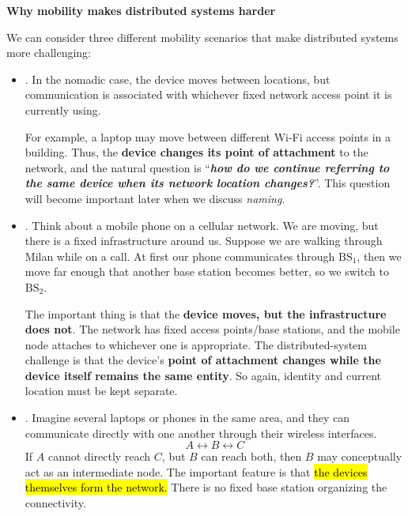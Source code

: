 \highspace
\begin{flushleft}
    \textcolor{Green3}{ \textbf{Why mobility makes distributed systems harder}}
\end{flushleft}
We can consider three different mobility scenarios that make distributed systems more challenging:
\begin{itemize}
    \item {}. In the nomadic case, the device moves between locations, but communication is associated with whichever fixed network access point it is currently using.

        For example, a laptop may move between different Wi-Fi access points in a building. Thus, the \textbf{device changes its point of attachment} to the network, and the natural question is ``\emph{\textbf{how do we continue referring to the same device when its network location changes?}}''. This question will become important later when we discuss \emph{naming}.

    \item {}. Think about a mobile phone on a cellular network. We are moving, but there is a fixed infrastructure around us. Suppose we are walking through Milan while on a call. At first our phone communicates through $\text{BS}_{1}$, then we move far enough that another base station becomes better, so we switch to $\text{BS}_{2}$.

        The important thing is that the \textbf{device moves, but the infrastructure does not}. The network has fixed access points/base stations, and the mobile node attaches to whichever one is appropriate. The distributed-system challenge is that the device's \textbf{point of attachment changes while the device itself remains the same entity}. So again, identity and current location must be kept separate.

    \item {}. Imagine several laptops or phones in the same area, and they can communicate directly with one another through their wireless interfaces.
        \begin{equation*}
            A \leftrightarrow B \leftrightarrow C
        \end{equation*}
        If $A$ cannot directly reach $C$, but $B$ can reach both, then $B$ may conceptually act as an intermediate node. The important feature is that \hl{the devices themselves form the network.} There is no fixed base station organizing the connectivity.


\end{itemize}
